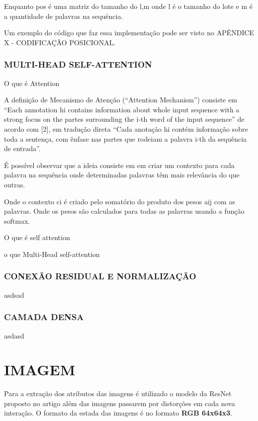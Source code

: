 Enquanto pos é uma matriz do tamanho do l,m onde l é o tamanho do lote e m é a quantidade de palavras na sequência.

Um exemplo do código que faz essa implementação pode ser visto no APÊNDICE X - CODIFICAÇÃO POSICIONAL.

\subsubsection{MULTI-HEAD SELF-ATTENTION}
O que é Attention

A definição de Mecanismo de Atenção (“Attention Mechanism”) consiste em “Each annotation hi contains information about whole input sequence with a strong focus on the partes surrounding the i-th word of the input sequence” de acordo com [2], em tradução direta “Cada anotação hi contém informação sobre toda a sentença, com ênfase nas partes que rodeiam a palavra i-th da sequência de entrada”.

É possível observar que a ideia consiste em em criar um contexto para cada palavra na sequência onde determinadas palavras têm mais relevância do que outras.

Onde o contexto ci é criado pelo somatório do produto dos pesos aij com as palavras. Onde os pesos são calculados para todas as palavras usando a função softmax.

O que é self attention

o que Multi-Head self-attention


\subsubsection{CONEXÃO RESIDUAL E NORMALIZAÇÃO}
asdsad

\subsubsection{CAMADA DENSA}
asdasd


\section{IMAGEM}

Para a extração dos atributos das imagens é utilizado o modelo da ResNet proposto no artigo \cite{resnet} além das imagens passarem por distorções em cada nova interação. O formato da estada das imagens é no formato \textbf{RGB 64x64x3}.

